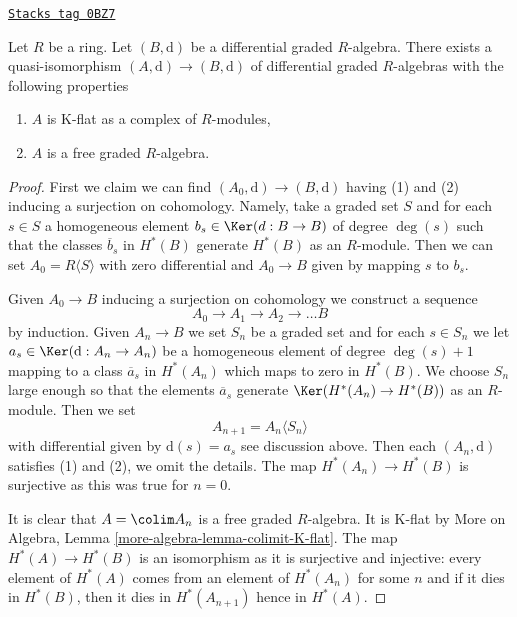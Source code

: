 \begin{lemma}
\label{dga-lemma-K-flat-resolution}
\href{https://stacks.math.columbia.edu/tag/0BZ7}{\texttt{Stacks tag 0BZ7}}

Let $R$ be a ring. Let $(B, \text{d})$ be a differential graded $R$-algebra.
There exists a quasi-isomorphism $(A, \text{d}) \to (B, \text{d})$ of
differential graded $R$-algebras with the following properties
\begin{enumerate}
\item $A$ is K-flat as a complex of $R$-modules,
\item $A$ is a free graded $R$-algebra.
\end{enumerate}
\end{lemma}

\begin{proof}
First we claim we can find $(A_0, \text{d}) \to (B, \text{d})$
having (1) and (2) inducing a surjection on cohomology.
Namely, take a graded set $S$ and for each $s \in S$
a homogeneous element $b_s \in \Ker(d : B \to B)$ of degree $\deg(s)$
such that the classes $\overline{b}_s$ in $H^*(B)$
generate $H^*(B)$ as an $R$-module.
Then we can set $A_0 = R\langle S \rangle$ with zero differential
and $A_0 \to B$ given by mapping $s$ to $b_s$.

\medskip\noindent
Given $A_0 \to B$ inducing a surjection on cohomology we construct
a sequence
$$
A_0 \to A_1 \to A_2 \to \ldots B
$$
by induction. Given $A_n \to B$ we set $S_n$ be a graded set
and for each $s \in S_n$ we let $a_s \in \Ker(\text{d} : A_n \to A_n)$
be a homogeneous element of degree $\deg(s) + 1$
mapping to a class $\overline{a}_s$ in $H^*(A_n)$
which maps to zero in $H^*(B)$. We choose $S_n$ large enough
so that the elements $\overline{a}_s$ generate $\Ker(H^*(A_n) \to H^*(B))$
as an $R$-module. Then we set
$$
A_{n + 1} = A_n\langle S_n \rangle
$$
with differential given by $\text{d}(s) = a_s$ see discussion above.
Then each $(A_n, \text{d})$ satisfies (1) and (2), we omit the details.
The map $H^*(A_n) \to H^*(B)$ is surjective as this was true for $n = 0$.

\medskip\noindent
It is clear that $A = \colim A_n$ is a free graded $R$-algebra.
It is K-flat by More on Algebra, Lemma \ref{more-algebra-lemma-colimit-K-flat}.
The map $H^*(A) \to H^*(B)$ is an isomorphism as it is surjective
and injective: every element of $H^*(A)$ comes from an element of
$H^*(A_n)$ for some $n$ and if it dies in $H^*(B)$, then it dies
in $H^*(A_{n + 1})$ hence in $H^*(A)$.
\end{proof}

